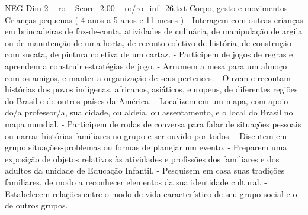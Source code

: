 \begin{textsample}{NEG Dim 2 – ro – Score -2.00 – ro/ro\_inf\_26.txt}  \label{ex:f2_neg_109}
Corpo, gesto e movimentos Crianças pequenas ( 4 anos a 5 anos e 11 meses ) - Interagem com outras crianças em brincadeiras de faz-de-conta, atividades de culinária, de manipulação de argila ou de manutenção de uma horta, de reconto coletivo de história, de construção com sucata, de pintura coletiva de um cartaz. - Participem de jogos de regras e aprendem a construir estratégias de jogo. - Arrumem a mesa para um almoço com os amigos, e manter a organização de seus pertences. - Ouvem e recontam histórias dos povos indígenas, africanos, asiáticos, europeus, de diferentes regiões do Brasil e de outros países da América. - Localizem em um mapa, com apoio do/a professor/a, sua cidade, ou aldeia, ou assentamento, e o local do Brasil no mapa mundial. - Participem de rodas de conversa para falar de situações pessoais ou narrar histórias familiares no grupo e ser ouvido por todos. - Discutem em grupo situações-problemas ou formas de planejar um evento. - Preparem uma exposição de objetos relativos às atividades e profissões dos familiares e dos adultos da unidade de Educação Infantil. - Pesquisem em casa suas tradições familiares, de modo a reconhecer elementos da sua identidade cultural. - Estabelecem relações entre o modo de vida característico de seu grupo social e o de outros grupos.

\end{textsample}
